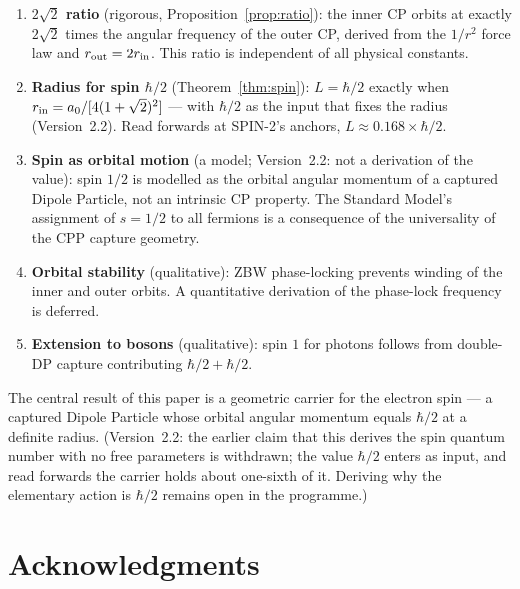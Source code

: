 \documentclass[12pt]{article}
\newcommand{\rin}{r_{\rm in}}
\newcommand{\rout}{r_{\rm out}}
\newcommand{\aBohr}{a_0}
\begin{document}
\begin{enumerate}
  \item \textbf{$2\sqrt{2}$ ratio} (rigorous, Proposition~\ref{prop:ratio}):
    the inner CP orbits at exactly $2\sqrt{2}$ times the angular
    frequency of the outer CP, derived from the $1/r^2$ force law and
    $\rout = 2\rin$.  This ratio is independent of all physical
    constants.

  \item \textbf{Radius for spin $\hbar/2$} (Theorem~\ref{thm:spin}):
    $L = \hbar/2$ exactly when $\rin = \aBohr/[4(1+\sqrt{2})^2]$ --- with
    $\hbar/2$ as the input that fixes the radius (Version~2.2). Read forwards
    at SPIN-2's anchors, $L \approx 0.168\times\hbar/2$.

  \item \textbf{Spin as orbital motion} (a model; Version~2.2: not a derivation of the value): spin $1/2$ is modelled as the
    orbital angular momentum of a captured Dipole Particle, not an
    intrinsic CP property.  The Standard Model's assignment of
    $s = 1/2$ to all fermions is a consequence of the universality of
    the CPP capture geometry.

  \item \textbf{Orbital stability} (qualitative): ZBW phase-locking
    prevents winding of the inner and outer orbits.  A quantitative
    derivation of the phase-lock frequency is deferred.

  \item \textbf{Extension to bosons} (qualitative): spin $1$ for
    photons follows from double-DP capture contributing $\hbar/2 +
    \hbar/2$.
\end{enumerate}

The central result of this paper is a geometric carrier for the electron
spin --- a captured Dipole Particle whose orbital angular momentum equals
$\hbar/2$ at a definite radius. (Version~2.2: the earlier claim that this
derives the spin quantum number with no free parameters is withdrawn; the value
$\hbar/2$ enters as input, and read forwards the carrier holds about one-sixth
of it. Deriving why the elementary action is $\hbar/2$ remains open in the
programme.)

\section*{Acknowledgments}
\end{document}
